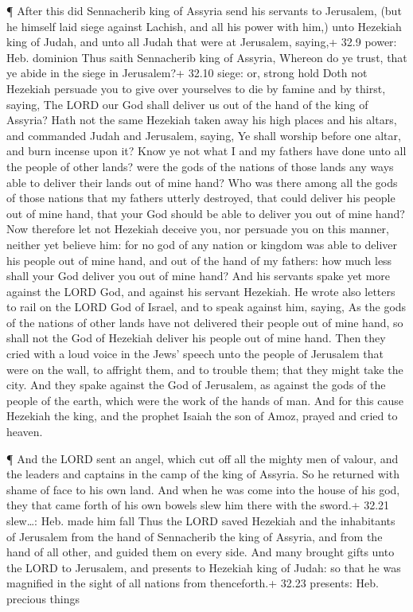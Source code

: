  ¶ After this did Sennacherib king of Assyria send his
servants to Jerusalem, (but he himself laid siege against Lachish, and
all his power with him,) unto Hezekiah king of Judah, and unto all Judah
that were at Jerusalem, saying,+ 32.9 power: Heb. dominion 
Thus saith Sennacherib king of Assyria, Whereon do ye trust, that ye
abide in the siege in Jerusalem?+ 32.10 siege: or, strong hold
 Doth not Hezekiah persuade you to give over yourselves to
die by famine and by thirst, saying, The LORD our God shall deliver us
out of the hand of the king of Assyria?  Hath not the same
Hezekiah taken away his high places and his altars, and commanded Judah
and Jerusalem, saying, Ye shall worship before one altar, and burn
incense upon it?  Know ye not what I and my fathers have
done unto all the people of other lands? were the gods of the nations of
those lands any ways able to deliver their lands out of mine hand?
 Who was there among all the gods of those nations that my
fathers utterly destroyed, that could deliver his people out of mine
hand, that your God should be able to deliver you out of mine hand?
 Now therefore let not Hezekiah deceive you, nor persuade
you on this manner, neither yet believe him: for no god of any nation or
kingdom was able to deliver his people out of mine hand, and out of the
hand of my fathers: how much less shall your God deliver you out of mine
hand?  And his servants spake yet more against the LORD
God, and against his servant Hezekiah.  He wrote also
letters to rail on the LORD God of Israel, and to speak against him,
saying, As the gods of the nations of other lands have not delivered
their people out of mine hand, so shall not the God of Hezekiah deliver
his people out of mine hand.  Then they cried with a loud
voice in the Jews' speech unto the people of Jerusalem that were on the
wall, to affright them, and to trouble them; that they might take the
city.  And they spake against the God of Jerusalem, as
against the gods of the people of the earth, which were the work of the
hands of man.  And for this cause Hezekiah the king, and
the prophet Isaiah the son of Amoz, prayed and cried to heaven.

 ¶ And the LORD sent an angel, which cut off all the mighty
men of valour, and the leaders and captains in the camp of the king of
Assyria. So he returned with shame of face to his own land. And when he
was come into the house of his god, they that came forth of his own
bowels slew him there with the sword.+ 32.21 slew\ldots: Heb. made him
fall  Thus the LORD saved Hezekiah and the inhabitants of
Jerusalem from the hand of Sennacherib the king of Assyria, and from the
hand of all other, and guided them on every side.  And many
brought gifts unto the LORD to Jerusalem, and presents to Hezekiah king
of Judah: so that he was magnified in the sight of all nations from
thenceforth.+ 32.23 presents: Heb. precious things

